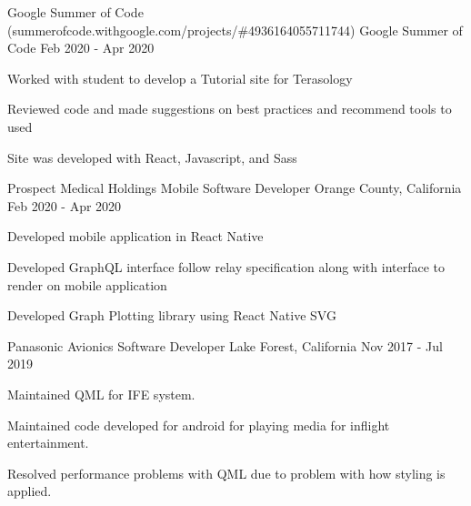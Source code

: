 

\begin{cventries}


    \cventry
    {Google Summer of Code (summerofcode.withgoogle.com/projects/\#4936164055711744)} %
    {Google Summer of Code} %
    {} %
    {Feb 2020 - Apr 2020} %
    {
      \begin{cvitems} %
         \item{Worked with student to develop a Tutorial site for Terasology}
         \item{Reviewed code and made suggestions on best practices and recommend tools to used}
         \item{Site was developed with React, Javascript, and Sass}
      \end{cvitems}
    }
    

    \cventry
    {Prospect Medical Holdings} %
    {Mobile Software Developer} %
    {Orange County, California} %
    {Feb 2020 - Apr 2020} %
    {
      \begin{cvitems} %
         \item{Developed mobile application in React Native}
         \item{Developed GraphQL interface follow relay specification along with interface to render on mobile application}
         \item{Developed Graph Plotting library using React Native SVG}
      \end{cvitems}
    }
    


    \cventry
    {Panasonic Avionics} %
    {Software Developer} %
    {Lake Forest, California} %
    {Nov 2017 - Jul 2019} %
    {
      \begin{cvitems} %
         \item{Maintained QML for IFE system.}
         \item{Maintained code developed for android for playing media for inflight entertainment.} 
         \item{Resolved performance problems with QML due to problem with how styling is applied.} 
      \end{cvitems}
    }
    

\end{cventries}
